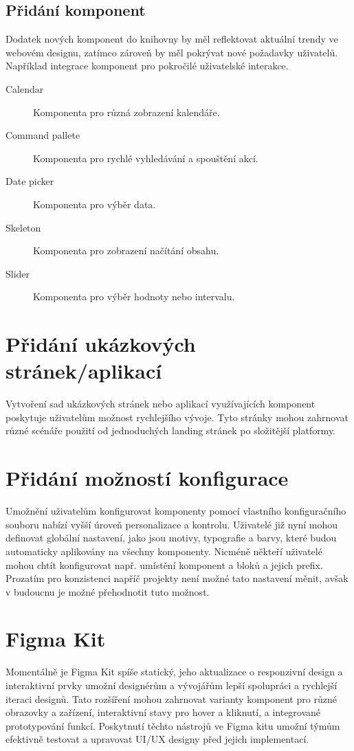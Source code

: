 \subsection{Přidání komponent}
Dodatek nových komponent do knihovny by měl reflektovat aktuální trendy ve webovém designu, zatímco zároveň by měl pokrývat nové požadavky uživatelů. Například integrace komponent pro pokročilé uživatelské interakce.

\begin{description}
  \item[Calendar] Komponenta pro různá zobrazení kalendáře.
  \item[Command pallete] Komponenta pro rychlé vyhledávání a spouštění akcí.
  \item[Date picker] Komponenta pro výběr data.
  \item[Skeleton] Komponenta pro zobrazení načítání obsahu.
  \item[Slider] Komponenta pro výběr hodnoty nebo intervalu.
\end{description}

\section{Přidání ukázkových stránek/aplikací}
Vytvoření sad ukázkových stránek nebo aplikací využívajících komponent poskytuje uživatelům možnost rychlejšího vývoje. Tyto stránky mohou zahrnovat různé scénáře použití od jednoduchých landing stránek po složitější platformy.

\section{Přidání možností konfigurace}
Umožnění uživatelům konfigurovat komponenty pomocí vlastního konfiguračního souboru nabízí vyšší úroveň personalizace a kontrolu. Uživatelé již nyní mohou definovat globální nastavení, jako jsou motivy, typografie a barvy, které budou automaticky aplikovány na všechny komponenty. Nicméně někteří uživatelé mohou chtít konfigurovat např. umístění komponent a bloků a jejich prefix. Prozatím pro konzistenci napříč projekty není možné tato nastavení měnit, avšak v budoucnu je možné přehodnotit tuto možnost.

\section{Figma Kit}
Momentálně je Figma Kit spíše statický, jeho aktualizace o responzivní design a interaktivní prvky umožní designérům a vývojářům lepší spolupráci a rychlejší iteraci designů. Tato rozšíření mohou zahrnovat varianty komponent pro různé obrazovky a zařízení, interaktivní stavy pro hover a kliknutí, a integrované prototypování funkcí. Poskytnutí těchto nástrojů ve Figma kitu umožní týmům efektivně testovat a upravovat UI/UX designy před jejich implementací.

